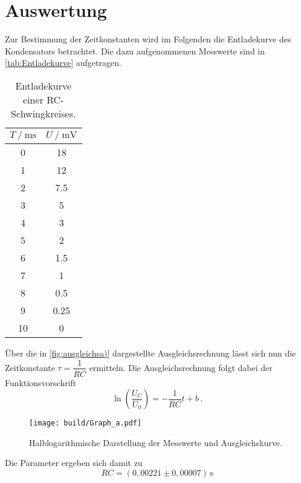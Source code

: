 \section{Auswertung}
\label{sec:Auswertung}

Zur Bestimmung der Zeitkonstanten wird im Folgenden die Entladekurve des Kondensators betrachtet.
Die dazu aufgenommenen Messwerte sind in \autoref{tab:Entladekurve} aufgetragen. 

\begin{table}[H]
  \centering
  \caption{Entladekurve einer RC-Schwingkreises.}
  \label{tab:Entladekurve}
  \begin{tabular}{S S}
    \toprule
    {$T \mathbin{/} \unit{\milli\second} $} &  {$ U \mathbin{/} \unit{\milli\volt}$} \\
          &         18     \\
            1      &         12     \\
            2      &         7.5    \\
            3      &         5      \\
            4      &         3      \\
            5      &         2      \\
            6      &         1.5    \\
            7      &         1      \\
            8      &         0.5    \\
            9      &         0.25   \\
            10     &         0      \\
  \end{tabular}
\end{table}

Über die in \autoref{fig:ausgleichsa)} dargestellte Ausgleichsrechnung lässt sich nun die Zeitkonstante $τ = \dfrac{1}{RC}$ ermitteln.
Die Ausgleichsrechnung folgt dabei der Funktionsvorschrift
\begin{equation*}
  \ln(\frac{U_C}{U_0}) = -\frac{1}{RC} t + b \,.
\end{equation*}

\begin{figure}[H]
  \centering
  \texttt{[image: build/Graph\_a.pdf]}
  \caption{Halblogarithmische Darstellung der Messwerte und Ausgleichskurve.}
  \label{fig:ausgleichsa)}
\end{figure}

Die Parameter ergeben sich damit zu 
\begin{equation*}
  RC = (0,00221 \pm 0,00007) \,\unit{\second}
\end{equation*} 

